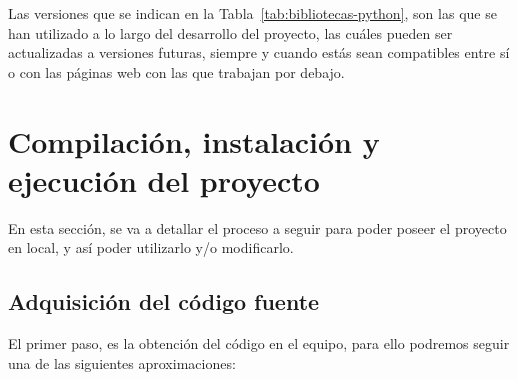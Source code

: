 Las versiones que se indican en la Tabla~\ref{tab:bibliotecas-python}, son las que se han utilizado a lo largo del desarrollo del proyecto, las cuáles pueden ser actualizadas a versiones futuras, siempre y cuando estás sean compatibles entre sí o con las páginas web con las que trabajan por debajo.

\section{Compilación, instalación y ejecución del proyecto}

En esta sección, se va a detallar el proceso a seguir para poder poseer el proyecto en local, y así poder utilizarlo y/o modificarlo. 

\subsection{Adquisición del código fuente}
El primer paso, es la obtención del código en el equipo, para ello podremos seguir una de las siguientes aproximaciones:

